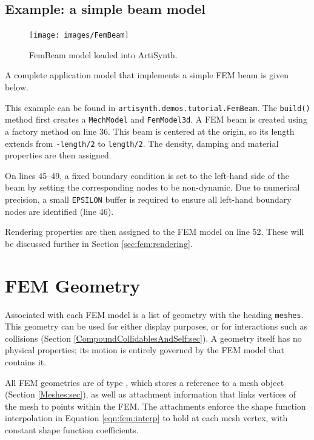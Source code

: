 \subsection{Example: a simple beam model}
\label{sec:fem:example:fembeam}

\begin{figure}[ht]
	\centering
	\texttt{[image: images/FemBeam]}
	\caption{FemBeam model loaded into ArtiSynth.}
	\label{fig:fem:beam}
\end{figure}

A complete application model that implements a simple FEM beam is given below.
\lstset{numbers=left}

\lstset{numbers=none}
This example can be found in {\tt artisynth.demos.tutorial.FemBeam}.  The 
{\tt build()} method first creates a {\tt MechModel} and {\tt FemModel3d}.
A FEM beam is created using a factory method on line 36.  This beam is
centered at the origin, so its length extends from {\tt-length/2} to 
{\tt length/2}.  The density, damping and material properties are then 
assigned.  

On lines 45--49, a fixed boundary condition is set to the left-hand side 
of the beam by setting the corresponding nodes to be non-dynamic.  Due to 
numerical precision, a small {\tt EPSILON} buffer is required to ensure 
all left-hand boundary nodes are identified (line 46).

Rendering properties are then assigned to the FEM model on line 52.  These 
will be discussed further in Section \ref{sec:fem:rendering}.

\section{FEM Geometry}
\label{sec:fem:geometry}

Associated with each FEM model is a list of geometry with the heading 
{\tt meshes}.  This geometry can be used for either display purposes, 
or for interactions such as collisions
(Section \ref{CompoundCollidablesAndSelf:sec}).  A geometry itself has no 
physical properties; its motion is entirely governed by the FEM model 
that contains it.  

All FEM geometries are of type , 
which stores a reference to a mesh object (Section \ref{Meshes:sec}), as well
as attachment information that links vertices of the mesh to points within
the FEM.  The attachments enforce the shape function interpolation in Equation
\eqref{eqn:fem:interp} to hold at each mesh vertex, with constant shape function
coefficients.

